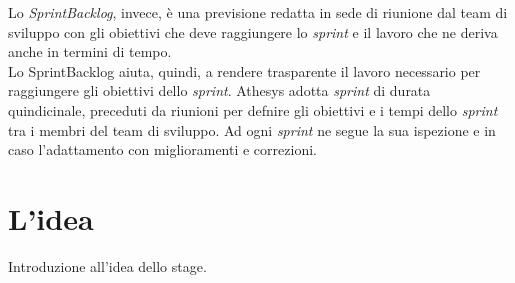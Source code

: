 Lo \emph{\gls{SprintBacklog}}\glsfirstoccur, invece, è una previsione redatta in sede di riunione dal team di sviluppo con gli obiettivi che deve raggiungere lo \textit{sprint} e il lavoro che ne deriva anche in termini di tempo.\\
Lo \gls{SprintBacklog} aiuta, quindi, a rendere trasparente il lavoro necessario per raggiungere gli obiettivi dello \textit{sprint}.
Athesys adotta \textit{sprint} di durata quindicinale, preceduti da riunioni per defnire gli obiettivi e i tempi dello \textit{sprint} tra i membri del team di sviluppo. Ad ogni \textit{sprint} ne segue la sua ispezione e in caso l'adattamento con miglioramenti e correzioni.





\section{L'idea}

Introduzione all'idea dello stage.

